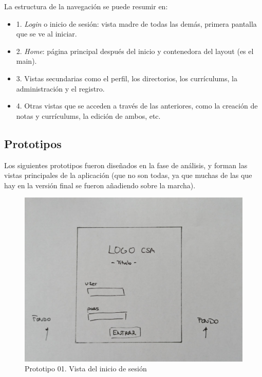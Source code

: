 La estructura de la navegación se puede resumir en:
\begin{itemize}
\tightlist
    \item 1. \emph{Login} o inicio de sesión: vista madre de todas las demás, primera pantalla que se ve al iniciar.
    \item 2. \emph{Home}: página principal después del inicio y contenedora del layout (es el main).
    \item 3. Vistas secundarias como el perfil, los directorios, los currículums, la administración y el registro.
    \item 4. Otras vistas que se acceden a través de las anteriores, como la creación de notas y currículums, la edición de ambos, etc.
\end{itemize}


\subsection{Prototipos}
Los siguientes prototipos fueron diseñados en la fase de análisis, y forman las vistas principales de la aplicación (que no son todas, ya que muchas de las que hay en la versión final se fueron añadiendo sobre la marcha).

\begin{figure}
    \centering
    \includegraphics[width=\linewidth]{img/PT01-Login.jpeg}
    \caption{Prototipo 01. Vista del inicio de sesión}    
\end{figure}

